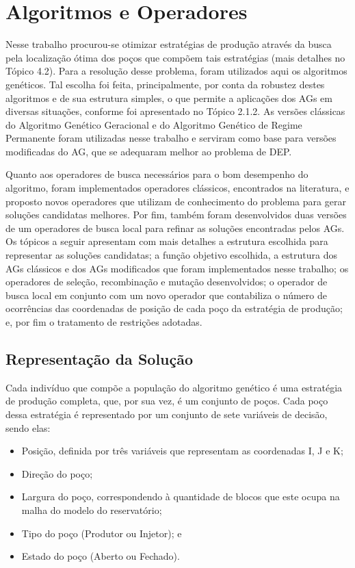 \chapter{Algoritmos e Operadores}
\label{ch:ch3}
Nesse trabalho procurou-se otimizar estratégias de produção através da busca pela localização ótima dos poços que compõem tais estratégias (mais detalhes no Tópico 4.2). Para a resolução desse problema, foram utilizados aqui os algoritmos genéticos. Tal escolha foi feita, principalmente, por conta da robustez destes algoritmos e de sua estrutura simples, o que permite a aplicações dos AGs em diversas situações, conforme foi apresentado no Tópico 2.1.2. As versões clássicas do Algoritmo Genético Geracional e do Algoritmo Genético de Regime Permanente foram utilizadas nesse trabalho e serviram como base para versões modificadas do AG, que se adequaram melhor ao problema de DEP.

Quanto aos operadores de busca necessários para o bom desempenho do algoritmo, foram implementados operadores clássicos, encontrados na literatura, e proposto novos operadores que utilizam de conhecimento do problema para gerar soluções candidatas melhores. Por fim, também foram desenvolvidos duas versões de um operadores de busca local para refinar as soluções encontradas pelos AGs. Os tópicos a seguir apresentam com mais detalhes a estrutura escolhida para representar as soluções candidatas; a função objetivo escolhida, a estrutura dos AGs clássicos e dos AGs modificados que foram implementados nesse trabalho; os operadores de seleção, recombinação e mutação desenvolvidos; o operador de busca local em conjunto com um novo operador que contabiliza o número de ocorrências das coordenadas de posição de cada poço da estratégia de produção; e, por fim o tratamento de restrições adotadas.  

\section{Representação da Solução}

Cada indivíduo que compõe a população do algoritmo genético é uma estratégia de produção completa, que, por sua vez, é um conjunto de poços. Cada poço dessa estratégia é representado por um conjunto de sete variáveis de decisão, sendo elas:

\begin{itemize}

\item Posição, definida por três variáveis que representam as coordenadas I, J e K;
\item Direção do poço;
\item Largura do poço, correspondendo à quantidade de blocos que este ocupa na malha do modelo do reservatório; 
\item Tipo do poço (Produtor ou Injetor); e
\item Estado do poço (Aberto ou Fechado).

\end{itemize}

